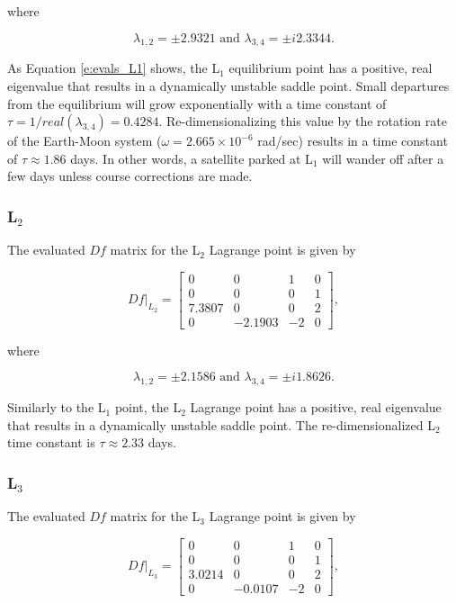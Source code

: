 \documentclass[11pt]{article} %
\begin{document}
\noindent
where

\begin{equation}
	\label{e:evals_L1}
	\lambda_{1,2} = \pm 2.9321 \text{ and } \lambda_{3,4} = \pm i2.3344.
\end{equation}

\noindent
As Equation \ref{e:evals_L1} shows, the L$_1$ equilibrium point has a positive, real eigenvalue that results in a dynamically unstable saddle point. Small departures from the equilibrium will grow exponentially with a time constant of $\tau = 1/real(\lambda_{3,4}) = 0.4284$. Re-dimensionalizing this value by the rotation rate of the Earth-Moon system ($\omega=2.665\times10^{-6}$ rad/sec) results in a time constant of $\tau\approx1.86$ days. In other words, a satellite parked at L$_1$ will wander off after a few days unless course corrections are made.

\subsubsection*{L$_2$}
The evaluated $Df$ matrix for the L$_2$ Lagrange point is given by

\doublespacing
\begin{equation}
	\label{e:df_eval_L2}
	Df|_{L_2} = 
	\begin{bmatrix} 
		0 & 0 & 1  & 0 \\ 
		0 & 0 & 0 & 1 \\
		7.3807 & 0 & 0 & 2 \\
		0 & -2.1903 & -2 & 0
	\end{bmatrix},
\end{equation}
\singlespacing

\noindent
where

\begin{equation}
	\label{e:evals_L2}
	\lambda_{1,2} = \pm 2.1586 \text{ and } \lambda_{3,4} = \pm i1.8626.
\end{equation}

\noindent
Similarly to the L$_1$ point, the L$_2$ Lagrange point has a positive, real eigenvalue that results in a dynamically unstable saddle point. The re-dimensionalized L$_2$ time constant is $\tau\approx2.33$ days. 

\subsubsection*{L$_3$}
The evaluated $Df$ matrix for the L$_3$ Lagrange point is given by

\doublespacing
\begin{equation}
	\label{e:df_eval_L3}
	Df|_{L_3} = 
	\begin{bmatrix} 
		0 & 0 & 1  & 0 \\ 
		0 & 0 & 0 & 1 \\
		3.0214 & 0 & 0 & 2 \\
		0 & -0.0107 & -2 & 0
	\end{bmatrix},
\end{equation}
\singlespacing
\end{document}
